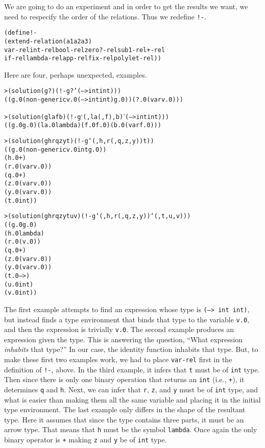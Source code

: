 We are going to do an experiment and in order to get the results
we want, we need to respecify the order of the relations.  Thus
we redefine \texttt{!-}.

\begin{alltt}
(define !-
  (extend-relation (a1 a2 a3)
    var-rel int-rel bool-rel zero?-rel sub1-rel +-rel
    if-rel lambda-rel app-rel fix-rel polylet-rel))
\end{alltt}

Here are four, perhaps unexpected, examples.

\begin{alltt}
> (solution (g ?) (!- g ? '(--> int int)))
((g.0 (non-generic v.0 (--> int int) g.0)) (?.0 (var v.0)))

\end{alltt}

\begin{alltt}
> (solution (g la f b) (!- g `(,la (,f) ,b) '(--> int int)))
((g.0 g.0) (la.0 lambda) (f.0 f.0) (b.0 (var f.0)))
\end{alltt}

\begin{alltt}
> (solution (g h r q z y t) (!- g `(,h ,r (,q ,z ,y)) t))
((g.0 (non-generic v.0 int g.0))
 (h.0 +)
 (r.0 (var v.0))
 (q.0 +)
 (z.0 (var v.0))
 (y.0 (var v.0))
 (t.0 int))
\end{alltt}

\begin{alltt}
> (solution (g h r q z y t u v) (!- g `(,h ,r (,q ,z ,y)) `(,t ,u ,v)))
((g.0 g.0)
 (h.0 lambda)
 (r.0 (v.0))
 (q.0 +)
 (z.0 (var v.0))
 (y.0 (var v.0))
 (t.0 -->)
 (u.0 int)
 (v.0 int))
\end{alltt}

The first example attempts to find an expression whose type is
\texttt{(--> int int)}, but instead finds a type environment that
binds that type to the variable \texttt{v.0}, and then the expression is
trivially \texttt{v.0}.  The second example produces an expression
given the type.  This is answering the question, ``What expression
\emph{inhabits} that type?''  In our case, the identity function
inhabits that type.  But, to make these first two examples work, we
had to place \texttt{var-rel} first in the definition of
\texttt{!-}, above.  In the third example, it infers that \texttt{t}
must be of \texttt{int} type.  Then since there is only one binary
operation that returns an \texttt{int} (i.e., \texttt{+}), it
determines \texttt{q} and \texttt{h}.  Next, we can infer that \texttt{r},
\texttt{z}, and \texttt{y} must be of \texttt{int} type, and what is
easier than making them all the same variable and placing it in the
initial type environment.  The last example only differs in the shape
of the resultant type.  Here it assumes that since the type contains
three parts, it must be an arrow type.  That means that \texttt{h}
must be the symbol \texttt{lambda}. Once again the only binary
operator is \texttt{+} making \texttt{z} and \texttt{y} be of
\texttt{int} type.

